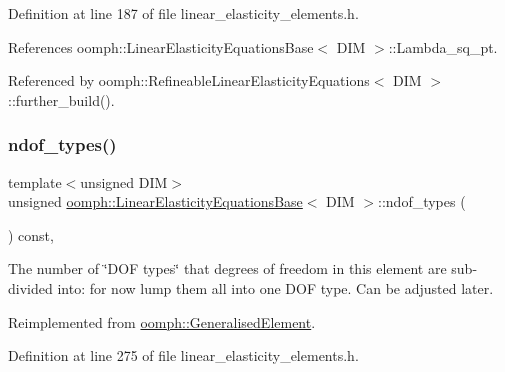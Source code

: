 Definition at line 187 of file linear\+\_\+elasticity\+\_\+elements.\+h.



References oomph\+::\+Linear\+Elasticity\+Equations\+Base$<$ D\+I\+M $>$\+::\+Lambda\+\_\+sq\+\_\+pt.



Referenced by oomph\+::\+Refineable\+Linear\+Elasticity\+Equations$<$ D\+I\+M $>$\+::further\+\_\+build().

\mbox{\label{classoomph_1_1LinearElasticityEquationsBase_adf786bf2d8fe20b864d7f2bf90b20242}} 
\subsubsection{\texorpdfstring{ndof\+\_\+types()}{ndof\_types()}}
{\footnotesize\ttfamily template$<$unsigned D\+IM$>$ \\
unsigned \hyperlink{classoomph_1_1LinearElasticityEquationsBase}{oomph\+::\+Linear\+Elasticity\+Equations\+Base}$<$ D\+IM $>$\+::ndof\+\_\+types (\begin{DoxyParamCaption}{ }\end{DoxyParamCaption}) const\hspace{0.3cm}{\ttfamily [inline]}, {\ttfamily [virtual]}}



The number of \char`\"{}\+D\+O\+F types\char`\"{} that degrees of freedom in this element are sub-\/divided into\+: for now lump them all into one D\+OF type. Can be adjusted later. 



Reimplemented from \hyperlink{classoomph_1_1GeneralisedElement_a0c6037a870597b35dcf1c780710b9a56}{oomph\+::\+Generalised\+Element}.



Definition at line 275 of file linear\+\_\+elasticity\+\_\+elements.\+h.

\mbox{\label{classoomph_1_1LinearElasticityEquationsBase_aee2dbde46c2c5eae21e47cc0fa3b9362}} 
